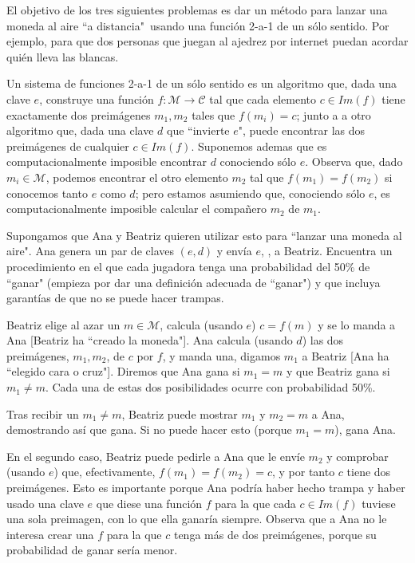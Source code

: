 {\vskip0.3cm}

El objetivo de los tres siguientes problemas es dar un método para lanzar una moneda al aire ``a
 distancia"\
 usando una función 2-a-1 de un sólo sentido. Por ejemplo, para que dos personas que juegan al ajedrez por internet
 puedan acordar quién lleva las blancas.

{\vskip0.2cm}

\begin{problem}[6]
Un sistema de funciones 2-a-1 de un sólo sentido es un algoritmo
que, dada una clave $e$, construye una función $f:\mathcal
M\longrightarrow\mathcal C$ tal que cada elemento $c\in Im(f)$
tiene exactamente dos preimágenes $m_1,m_2$ tales que $f(m_i)=c$;
junto a a otro algoritmo que, dada una clave $d$ que ``invierte
$e$", puede encontrar las dos preimágenes de cualquier $c\in
Im(f)$. Suponemos ademas que es computacionalmente imposible
encontrar $d$ conociendo sólo $e$. Observa que, dado
$m_i\in\mathcal M$, podemos encontrar el otro elemento $m_2$ tal
que $f(m_1)=f(m_2)$ si conocemos tanto $e$ como $d$; pero estamos
asumiendo que, conociendo sólo $e$, es computacionalmente
imposible calcular el compañero $m_2$ de  $m_1$.

Supongamos que Ana y Beatriz quieren utilizar esto para ``lanzar
una moneda al aire". Ana genera un par de claves $(e,d)$ y envía
$e$, \underbar{pero no $d$}, a Beatriz. Encuentra un procedimiento
en el que cada jugadora tenga una probabilidad del 50\% de
``ganar" (empieza por dar una definición adecuada de ``ganar") y
que incluya garantías de que no se puede hacer trampas.
\solution

Beatriz elige al azar un $m\in\mathcal M$, calcula (usando $e$) $c=f(m)$ y se lo manda a Ana [Beatriz ha ``creado la moneda"]. Ana calcula (usando $d$) las dos preimágenes, $m_1, m_2$, de $c$ por $f$, y manda una, digamos $m_1$ a Beatriz [Ana ha ``elegido cara o cruz"]. Diremos que Ana gana si $m_1=m$ y que Beatriz gana si $m_1\not=m$. Cada una de estas dos posibilidades ocurre con probabilidad 50\%.

Tras recibir un $m_1\not=m$, Beatriz puede mostrar $m_1$ y $m_2=m$ a Ana, demostrando así que gana. Si no puede hacer esto (porque $m_1=m$), gana Ana.

En el segundo caso, Beatriz puede pedirle a Ana que le envíe $m_2$ y comprobar (usando $e$) que, efectivamente, $f(m_1)=f(m_2)=c$, y por tanto $c$ tiene dos preimágenes. Esto es importante porque Ana podría haber hecho trampa y haber usado una clave $e$ que diese una función $f$ para la que cada $c\in Im(f)$ tuviese una sola preimagen, con lo que ella ganaría siempre. Observa que a Ana no le interesa crear una $f$ para la que $c$ tenga más de dos preimágenes, porque su probabilidad de ganar sería menor.

\end{problem}


